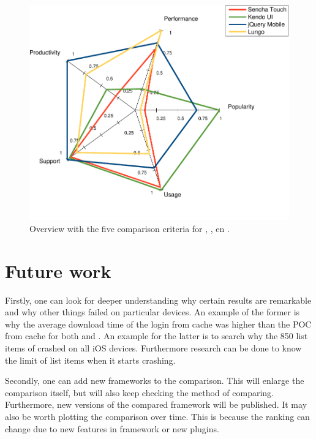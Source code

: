\documentclass[a4paper]{artikel3}
\begin{document}
\begin{figure}
  \centering
  \includegraphics[width=\columnwidth]{../Masterproef/figuren/spidergraph-final-en.pdf}
  \caption{Overview with the five comparison criteria for \sta{},  \kendoa{},  \jqma{} en \lungo{}.}
  \label{fig:spidergraph}
\end{figure}


\section{Future work} %
\label{sec:future_work}
Firstly, one can look for deeper understanding why certain results are remarkable and why other things failed on particular devices.
An example of the former is why the average download time of the login from cache was higher than the POC from cache for both \jqma{} and \lungo{}.
An example for the latter is to search why the 850 list items of \kendoa{} crashed on all iOS devices.
Furthermore research can be done to know the limit of list items when it starts crashing.

Secondly, one can add new frameworks to the comparison.
This will enlarge the comparison itself, but will also keep checking the method of comparing.
Furthermore, new versions of the compared framework will be published.
It may also be worth plotting the comparison over time.
This is because the ranking can change due to new features in framework or new plugins.
\end{document}
